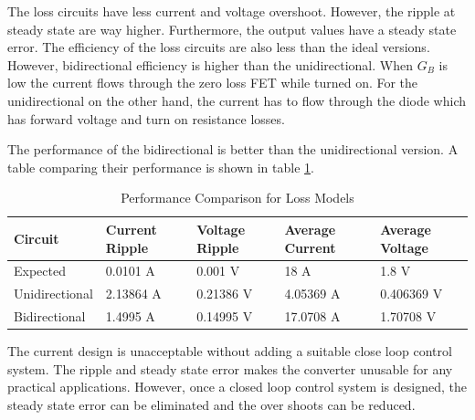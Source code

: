 \documentclass{article}
\begin{document}
The loss circuits have less current and voltage overshoot.
However, the ripple at steady state are way higher.
Furthermore, the output values have a steady state error.
The efficiency of the loss circuits are also less than the ideal versions.
However, bidirectional efficiency is higher than the unidirectional.
When $G_B$ is low the current flows through the zero loss FET while turned on.
For the unidirectional on the other hand, the current has to flow through the diode which has forward voltage and turn on resistance losses.

The performance of the bidirectional is better than the unidirectional version.
A table comparing their performance is shown in table \ref{tab:comparison}.

\begin{table}[ht]
    \caption{Performance Comparison for Loss Models}
    \label{tab:comparison}
    \begin{tabularx}{\textwidth}{| X | X | X | X | X |}
        \hline
        Circuit        & Current Ripple & Voltage Ripple & Average Current & Average Voltage \\
        \hline
        Expected       & 0.0101 A       & 0.001 V        & 18 A            & 1.8 V           \\
        Unidirectional & 2.13864 A      & 0.21386 V      & 4.05369 A       & 0.406369 V      \\
        Bidirectional  & 1.4995 A       & 0.14995 V      & 17.0708 A       & 1.70708 V       \\
        \hline
    \end{tabularx}
\end{table}

The current design is unacceptable without adding a suitable close loop control system.
The ripple and steady state error makes the converter unusable for any practical applications.
However, once a closed loop control system is designed, the steady state error can be eliminated and the over shoots can be reduced.

\clearpage{}

\printbibliography{}

\clearpage{}


% 
% 
\end{document}
